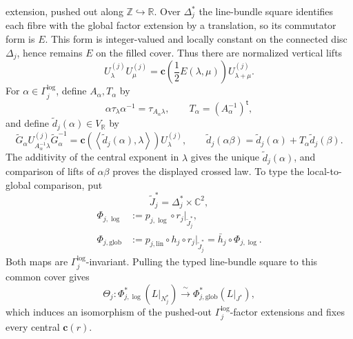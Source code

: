 \begin{auditrecord}
extension, pushed out along $\mathbb Z\hookrightarrow\mathbb R$.  Over
$\Delta_j^*$ the line-bundle square identifies each fibre with the global
factor extension by a translation, so its commutator form is $E$.  This form
is integer-valued and locally constant on the connected disc $\Delta_j$,
hence remains $E$ on the filled cover.  Thus there are normalized vertical
lifts
\[
 U_\lambda^{(j)}U_\mu^{(j)}
 =\mathbf c\!\left(\frac12E(\lambda,\mu)\right)U_{\lambda+\mu}^{(j)}.
\]
For $\alpha\in\Gamma_j^{\log}$, define $A_\alpha,T_\alpha$ by
\[
 \alpha\tau_\lambda\alpha^{-1}=\tau_{A_\alpha\lambda},\qquad
 T_\alpha=(A_\alpha^{-1})^{\mathsf t},
\]
and define
$\widetilde d_j(\alpha)\in V_{\mathbb R}$ by
\[
 \widetilde G_\alpha
 U_{A_\alpha^{-1}\lambda}^{(j)}\widetilde G_\alpha^{-1}
 =\mathbf c\!\left(\left\langle\widetilde d_j(\alpha),\lambda\right\rangle\right)
 U_\lambda^{(j)},\qquad
 \widetilde d_j(\alpha\beta)
 =\widetilde d_j(\alpha)+T_\alpha\widetilde d_j(\beta).
\]
The additivity of the central exponent in $\lambda$ gives the unique
$\widetilde d_j(\alpha)$, and comparison of lifts of $\alpha\beta$ proves
the displayed crossed law.  To type the local-to-global comparison, put
\[
 \widetilde J_j^*=\Delta_j^*\times\mathbb C^2,
\]
\[
\begin{aligned}
 \Phi_{j,\log}
  &:=p_{j,\log}\circ r_j|_{\widetilde J_j^*},\\
 \Phi_{j,\mathrm{glob}}
  &:=p_{j,\mathrm{lin}}\circ h_j\circ r_j|_{\widetilde J_j^*}
   =\bar h_j\circ\Phi_{j,\log}.
\end{aligned}
\]
Both maps are $\Gamma_j^{\log}$-invariant.  Pulling the typed line-bundle
square to this common cover gives
\[
 \Theta_j:
 \Phi_{j,\log}^*(L|_{N_j^*})
 \xrightarrow{\ \sim\ }
 \Phi_{j,\mathrm{glob}}^*(L|_{J^*}),
\]
which induces an isomorphism of the pushed-out
$\Gamma_j^{\log}$-factor extensions and fixes every central
$\mathbf c(r)$.


\end{auditrecord}

